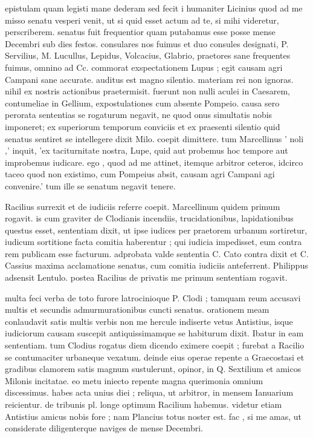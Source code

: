 


 epistulam quam legisti mane dederam sed fecit i humaniter Licinius quod ad me misso senatu vesperi venit, ut si quid esset actum ad te, si mihi videretur, perscriberem. senatus fuit frequentior quam putabamus esse posse mense Decembri sub dies festos. consulares nos fuimus et duo consules designati, P. Servilius, M. Lucullus, Lepidus, Volcacius, Glabrio, praetores sane frequentes fuimus, omnino ad Cc. commorat exspectationem Lupus ; egit causam agri Campani sane accurate. auditus est magno silentio. materiam rei non ignoras. nihil ex nostris actionibus praetermisit. fuerunt non nulli aculei in Caesarem, contumeliae in Gellium, expostulationes cum absente Pompeio. causa sero perorata sententias se rogaturum negavit, ne quod onus simultatis nobis imponeret; ex superiorum temporum conviciis et ex praesenti silentio quid senatus sentiret se intellegere dixit Milo. coepit dimittere. tum Marcellinus ' noli ,' inquit, 'ex taciturnitate nostra, Lupe, quid aut probemus hoc tempore aut improbemus iudicare. ego , quod ad me attinet, itemque arbitror ceteros, idcirco taceo quod non existimo, cum Pompeius absit, causam agri Campani agi convenire.' tum ille se senatum negavit tenere.

 Racilius surrexit et de iudiciis referre coepit. Marcellinum quidem primum rogavit. is cum graviter de Clodianis incendiis, trucidationibus, lapidationibus questus esset, sententiam dixit, ut ipse iudices per praetorem urbanum sortiretur, iudicum sortitione facta comitia haberentur ; qui iudicia impedisset, eum contra rem publicam esse facturum. adprobata valde sententia C. Cato contra dixit et C. Cassius maxima acclamatione senatus, cum comitia iudiciis anteferrent. Philippus adsensit Lentulo. postea Racilius de privatis me primum sententiam rogavit.

 multa feci verba de toto furore latrocinioque P. Clodi ; tamquam reum accusavi multis et secundis admurmurationibus cuncti senatus. orationem meam conlaudavit satis multis verbis non me hercule indiserte vetus Antistius, isque iudiciorum causam suscepit antiquissimamque se habiturum dixit. Ibatur in eam sententiam. tum Clodius rogatus diem dicendo eximere coepit ; furebat a Racilio se contumaciter urbaneque vexatum. deinde eius operae repente a Graecostasi et gradibus clamorem satis magnum sustulerunt, opinor, in Q. Sextilium et amicos Milonis incitatae. eo metu iniecto repente magna querimonia omnium discessimus. habes acta unius diei ; reliqua, ut arbitror, in mensem Ianuarium reicientur. de tribunis pl. longe optimum Racilium habemus. videtur etiam Antistius amicus nobis fore ; nam Plancius totus noster est. fac , si me amas, ut considerate diligenterque naviges de mense Decembri.
